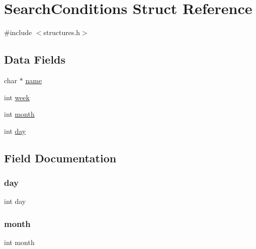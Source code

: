 \hypertarget{struct_search_conditions}{}\section{Search\+Conditions Struct Reference}
\label{struct_search_conditions}


{\ttfamily \#include $<$structures.\+h$>$}

\subsection*{Data Fields}
\begin{DoxyCompactItemize}
\item 
char $\ast$ \hyperlink{struct_search_conditions_a5ac083a645d964373f022d03df4849c8}{name}
\item 
int \hyperlink{struct_search_conditions_a3560bdec25d509ef8f4f02409eaa9f1d}{week}
\item 
int \hyperlink{struct_search_conditions_aedb06abe5aff12fa3e7e0e71a374edfb}{month}
\item 
int \hyperlink{struct_search_conditions_a4c11afc03fc3ee49bab660def6558f2a}{day}
\end{DoxyCompactItemize}


\subsection{Field Documentation}
\mbox{\label{struct_search_conditions_a4c11afc03fc3ee49bab660def6558f2a}} 
\subsubsection{\texorpdfstring{day}{day}}
{\footnotesize\ttfamily int day}

\mbox{\label{struct_search_conditions_aedb06abe5aff12fa3e7e0e71a374edfb}} 
\subsubsection{\texorpdfstring{month}{month}}
{\footnotesize\ttfamily int month}

